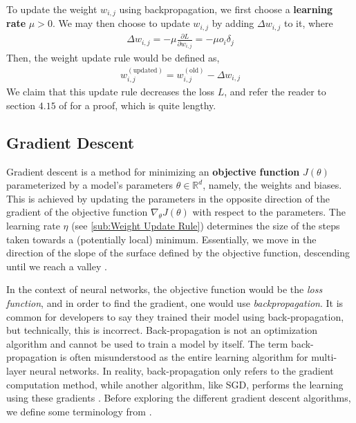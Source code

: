 \documentclass{article}
\begin{document}
  To update the weight $w_{i,j}$ using backpropagation, we first choose a \textbf{learning rate} $\mu> 0$. We may then choose to update $w_{i,j}$ by adding $\Delta w_{i,j}$ to it, where
  \begin{equation*}
    \begin{split}
      \Delta w_{i,j} = -\mu \frac{\partial {L}}{\partial {w_{i,j}}}  = - \mu  o_i \delta_j
    \end{split}
  \end{equation*}
 Then, the weight update rule would be defined as, 
 \begin{equation*}
  \begin{split}
    w_{i,j}^{(\text{updated})} =  w_{i,j}^{(\text{old})} - \Delta w_{i,j} 
  \end{split}
 \end{equation*}
 We claim that this update rule decreases the loss $L$, and refer the reader to section $4.15$ of \cite{Hagan_Martin} for a proof, which is quite lengthy.  
\subsection{Gradient Descent}%
  \label{sub:Gradient Descent}
  
Gradient descent is a method for minimizing an \textbf{objective function} \( J(\theta) \) parameterized by a model's parameters \( \theta \in \mathbb{R}^d \), namely, the weights and biases. This is achieved by updating the parameters in the opposite direction of the gradient of the objective function \( \nabla_{\theta} J(\theta) \) with respect to the parameters. The learning rate \( \eta \) (see \autoref{sub:Weight Update Rule}) determines the size of the steps taken towards a (potentially local) minimum. Essentially, we move in the direction of the slope of the surface defined by the objective function, descending until we reach a valley \citep{ruder2017overview}. 

   In the context of neural networks, the objective function would be the \textit{loss function}, and in order to find the gradient, one would use \textit{backpropagation}. It is common for developers to say they trained their model using back-propagation, but technically, this is incorrect. Back-propagation is not an optimization algorithm and cannot be used to train a model by itself. The term back-propagation is often misunderstood as the entire learning algorithm for multi-layer neural networks. In reality, back-propagation only refers to the gradient computation method, while another algorithm, like SGD, performs the learning using these gradients \citep{Goodfellow-et-al-2016}. Before exploring the different gradient descent algorithms, we define some terminology from \cite{batchvsEpoch}. 
\end{document}
